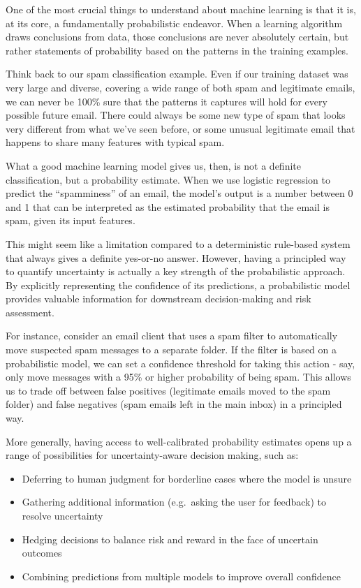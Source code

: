 \documentclass[
  9pt,
  letterpaper,
  abstract,
  titlepage]{scrbook}
\begin{document}
One of the most crucial things to understand about machine learning is
that it is, at its core, a fundamentally probabilistic endeavor. When a
learning algorithm draws conclusions from data, those conclusions are
never absolutely certain, but rather statements of probability based on
the patterns in the training examples.

Think back to our spam classification example. Even if our training
dataset was very large and diverse, covering a wide range of both spam
and legitimate emails, we can never be 100\% sure that the patterns it
captures will hold for every possible future email. There could always
be some new type of spam that looks very different from what we've seen
before, or some unusual legitimate email that happens to share many
features with typical spam.

What a good machine learning model gives us, then, is not a definite
classification, but a probability estimate. When we use logistic
regression to predict the ``spamminess'' of an email, the model's output
is a number between 0 and 1 that can be interpreted as the estimated
probability that the email is spam, given its input features.

This might seem like a limitation compared to a deterministic rule-based
system that always gives a definite yes-or-no answer. However, having a
principled way to quantify uncertainty is actually a key strength of the
probabilistic approach. By explicitly representing the confidence of its
predictions, a probabilistic model provides valuable information for
downstream decision-making and risk assessment.

For instance, consider an email client that uses a spam filter to
automatically move suspected spam messages to a separate folder. If the
filter is based on a probabilistic model, we can set a confidence
threshold for taking this action - say, only move messages with a 95\%
or higher probability of being spam. This allows us to trade off between
false positives (legitimate emails moved to the spam folder) and false
negatives (spam emails left in the main inbox) in a principled way.

More generally, having access to well-calibrated probability estimates
opens up a range of possibilities for uncertainty-aware decision making,
such as:

\begin{itemize}
\item
  Deferring to human judgment for borderline cases where the model is
  unsure
\item
  Gathering additional information (e.g.~asking the user for feedback)
  to resolve uncertainty
\item
  Hedging decisions to balance risk and reward in the face of uncertain
  outcomes
\item
  Combining predictions from multiple models to improve overall
  confidence
\end{itemize}
\end{document}
